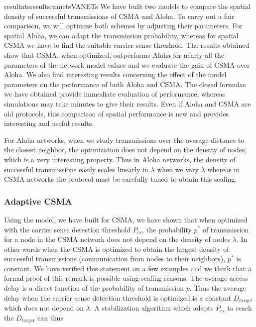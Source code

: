\documentclass{ra2016}
\begin{document}
\begin{module}{resultats}{results:vanets}{VANETs}
We have built two models  to compare the spatial density of successful 
transmissions of CSMA and Aloha. 
To carry out a  fair comparison, we will optimize both schemes by adjusting their parameters. 
For spatial Aloha, we can adapt the 
transmission probability, whereas for spatial CSMA we have to find the suitable carrier sense threshold. The results obtained show that CSMA, when optimized, outperforms Aloha 
for nearly all the parameters of the network model values 
and we evaluate the gain of CSMA over Aloha. 
We also find interesting results concerning the effect of the model parameters on the performance 
of both Aloha and CSMA. 
The closed formulas we have obtained provide immediate evaluation of performance, whereas 
simulations may take minutes to give their results. Even if Aloha and CSMA are old protocols, 
this comparison of spatial performance is new and provides interesting and useful results. 

For Aloha networks, when we study transmissions over the average distance to the closest 
neighbor, the optimization does not depend on the density of nodes, 
which is a very interesting property. Thus in Aloha networks, the density of 
successful transmissions easily scales linearly in $\lambda$ when we vary 
$\lambda$ whereas in CSMA networks the protocol must be carefully 
tuned to obtain this scaling. 

\subsubsection{Adaptive CSMA}

Using the model, we have built for CSMA, we have shown that when optimized 
with the carrier sense detection threshold $P_{cs}$, 
the probability $p^*$ of transmission for a node 
in the CSMA network does not depend on the density of nodes $\lambda$. 
In other words when the CSMA is optimized to obtain the largest density of successful 
transmissions (communication from nodes to their neighbors), $p^*$  is constant.
We have verified this statement 
on a few examples and we think that a formal proof of this remark is possible using 
scaling  reasons. The average access delay is a direct function of the probability of transmission $p$. Thus the average delay when the carrier sense detection threshold is optimized 
is a constant $D_{target}$ which does not depend on $\lambda$. 
A stabilization algorithm which 
adapts $P_{cs}$ to reach the $D_{target}$ can thus 









\end{module} 
\end{document}
